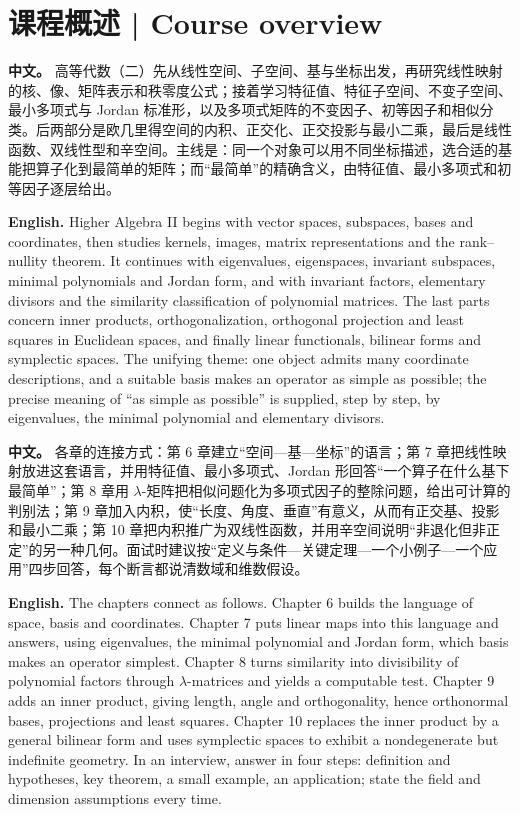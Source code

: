 \documentclass[UTF8,11pt,a4paper]{ctexart}
\newcommand{\APS}[2]{\par\noindent\textbf{中文。} #1\par\noindent\textbf{English.} #2\par\smallskip}
\begin{document}
\section*{课程概述 | Course overview}
\APS{高等代数（二）先从线性空间、子空间、基与坐标出发，再研究线性映射的核、像、矩阵表示和秩零度公式；接着学习特征值、特征子空间、不变子空间、最小多项式与 Jordan 标准形，以及多项式矩阵的不变因子、初等因子和相似分类。后两部分是欧几里得空间的内积、正交化、正交投影与最小二乘，最后是线性函数、双线性型和辛空间。主线是：同一个对象可以用不同坐标描述，选合适的基能把算子化到最简单的矩阵；而“最简单”的精确含义，由特征值、最小多项式和初等因子逐层给出。}{Higher Algebra II begins with vector spaces, subspaces, bases and coordinates, then studies kernels, images, matrix representations and the rank--nullity theorem. It continues with eigenvalues, eigenspaces, invariant subspaces, minimal polynomials and Jordan form, and with invariant factors, elementary divisors and the similarity classification of polynomial matrices. The last parts concern inner products, orthogonalization, orthogonal projection and least squares in Euclidean spaces, and finally linear functionals, bilinear forms and symplectic spaces. The unifying theme: one object admits many coordinate descriptions, and a suitable basis makes an operator as simple as possible; the precise meaning of ``as simple as possible'' is supplied, step by step, by eigenvalues, the minimal polynomial and elementary divisors.}
\APS{各章的连接方式：第 6 章建立“空间—基—坐标”的语言；第 7 章把线性映射放进这套语言，并用特征值、最小多项式、Jordan 形回答“一个算子在什么基下最简单”；第 8 章用 $\lambda$-矩阵把相似问题化为多项式因子的整除问题，给出可计算的判别法；第 9 章加入内积，使“长度、角度、垂直”有意义，从而有正交基、投影和最小二乘；第 10 章把内积推广为双线性函数，并用辛空间说明“非退化但非正定”的另一种几何。面试时建议按“定义与条件—关键定理—一个小例子—一个应用”四步回答，每个断言都说清数域和维数假设。}{The chapters connect as follows. Chapter 6 builds the language of space, basis and coordinates. Chapter 7 puts linear maps into this language and answers, using eigenvalues, the minimal polynomial and Jordan form, which basis makes an operator simplest. Chapter 8 turns similarity into divisibility of polynomial factors through $\lambda$-matrices and yields a computable test. Chapter 9 adds an inner product, giving length, angle and orthogonality, hence orthonormal bases, projections and least squares. Chapter 10 replaces the inner product by a general bilinear form and uses symplectic spaces to exhibit a nondegenerate but indefinite geometry. In an interview, answer in four steps: definition and hypotheses, key theorem, a small example, an application; state the field and dimension assumptions every time.}
\end{document}

